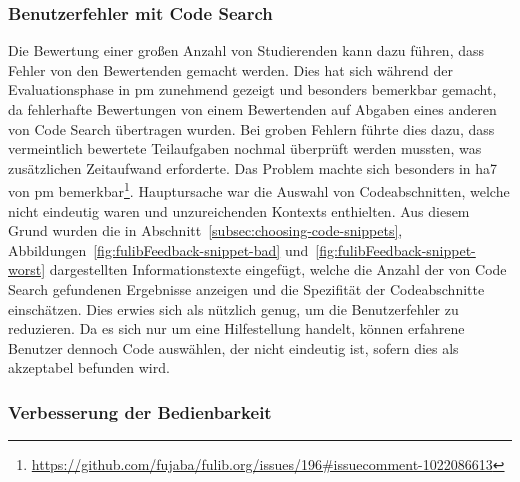 \subsubsection{Benutzerfehler mit Code Search}

Die Bewertung einer großen Anzahl von Studierenden kann dazu führen, dass Fehler von den Bewertenden gemacht werden.
Dies hat sich während der Evaluationsphase in \ac{pm} zunehmend gezeigt und besonders bemerkbar gemacht, da fehlerhafte Bewertungen von einem Bewertenden auf Abgaben eines anderen von Code Search übertragen wurden.
Bei groben Fehlern führte dies dazu, dass vermeintlich bewertete Teilaufgaben nochmal überprüft werden mussten, was zusätzlichen Zeitaufwand erforderte.
Das Problem machte sich besonders in \ac{ha}7 von \ac{pm} bemerkbar\footnote{
    \url{https://github.com/fujaba/fulib.org/issues/196\#issuecomment-1022086613}
}.
Hauptursache war die Auswahl von Codeabschnitten, welche nicht eindeutig waren und unzureichenden Kontexts enthielten.
Aus diesem Grund wurden die in Abschnitt~\ref{subsec:choosing-code-snippets}, Abbildungen~\ref{fig:fulibFeedback-snippet-bad} und~\ref{fig:fulibFeedback-snippet-worst} dargestellten Informationstexte eingefügt, welche die Anzahl der von Code Search gefundenen Ergebnisse anzeigen und die Spezifität der Codeabschnitte einschätzen.
Dies erwies sich als nützlich genug, um die Benutzerfehler zu reduzieren.
Da es sich nur um eine Hilfestellung handelt, können erfahrene Benutzer dennoch Code auswählen, der nicht eindeutig ist, sofern dies als akzeptabel befunden wird.

\subsubsection{Verbesserung der Bedienbarkeit}

